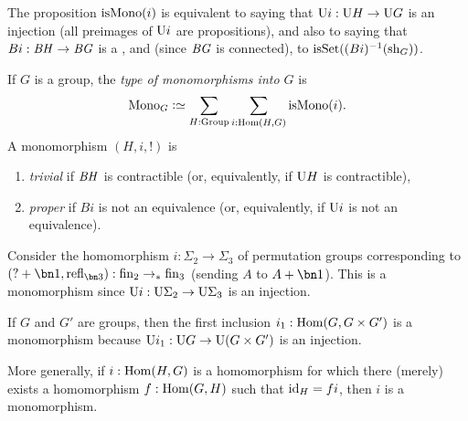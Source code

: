 The proposition $\ismono(i)$ is equivalent to saying that $\mathrm{U} i:\mathrm{U} H\to \mathrm{U} G$ is an injection (all preimages of $\mathrm{U} i$ are propositions), and also to saying that $B i:\mathit{B}\mathit{H}\to\mathit{B}\mathit{G}$ is a \covering, and (since $\mathit{B}\mathit{G}$ is connected), to $\isset((Bi)^{-1}(\sh_G))$.
\begin{definition}
  \label{def:typeofmono}
  If $G$ is a group, the \emph{type of monomorphisms into $G$} is
  $$\typemono_G\defequi\sum_{H:\typegroup}\sum_{i:\Hom(H,G)}\ismono(i).$$
  A monomorphism $(H,i,!)$ is
      \begin{enumerate}
      \item \emph{trivial} if $\mathit{B}\mathit{H}$ is contractible (or, equivalently, if $\mathrm{U} H$ is contractible),
      \item \emph{proper} if $Bi$ is not an equivalence (or, equivalently, if $\mathrm{U} i$ is not an equivalence).
      \end{enumerate}
\end{definition}

\begin{example}
  \label{ex:sigma2inSigma3}
  Consider the  homomorphism $i:\Sigma_2\to\Sigma_3$ of permutation groups corresponding to $(?+\bn 1,\refl{\bn 3}):\fin_2\to_*\fin_3$ (sending $A$ to $A+\bn 1$).  This is a monomorphism since $\mathrm{U} i:\mathrm{U}\Sigma_2\to\mathrm{U}\Sigma_3$ is an injection.
\end{example}

\begin{example}
  \label{ex:prodinclismono}
  If $G$ and $G'$ are groups, then the first inclusion $i_1:\Hom(G,G\times G')$ is a monomorphism because $\mathrm{U} i_1:\mathrm{U} G\to \mathrm{U}(G\times G')$ is an injection.

  More generally, if $i:\Hom(H,G)$ is a homomorphism for which there (merely) exists a homomorphism $f:\Hom(G,H)$ such that $\mathord{\mathrm{id}}_H=fi$, then $i$ is a monomorphism.
  \end{example}

